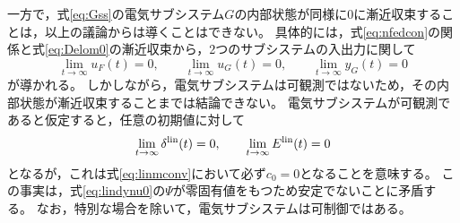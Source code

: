 \documentclass[tombow,dvipdfmx]{corona-a5-1.1}
\begin{document}
一方で，式\ref{eq:Gss}の電気サブシステム$G$の内部状態が同様に0に漸近収束することは，以上の議論からは導くことはできない。
具体的には，式\ref{eq:nfedcon}の関係と式\ref{eq:Delom0}の漸近収束から，2つのサブシステムの入出力に関して
\[
\lim_{t\rightarrow \infty} u_F(t)  =0,\qquad
\lim_{t\rightarrow \infty} u_G(t)  =0,\qquad
\lim_{t\rightarrow \infty} y_G(t)  =0
\]
が導かれる。
しかしながら，電気サブシステムは可観測ではないため，その内部状態が漸近収束することまでは結論できない。
電気サブシステムが可観測であると仮定すると，任意の初期値に対して
\[
\lim_{t\rightarrow \infty}  \delta^{\rm lin}(t)  =0,\qquad
\lim_{t\rightarrow \infty}  E^{\rm lin}(t)  =0
\]
となるが，これは式\ref{eq:linmconv}において必ず$c_0=0$となることを意味する。
この事実は，式\ref{eq:lindynu0}の$\Psi$が零固有値をもつため安定でないことに矛盾する。
なお，特別な場合を除いて，電気サブシステムは可制御ではある。
\end{document}
